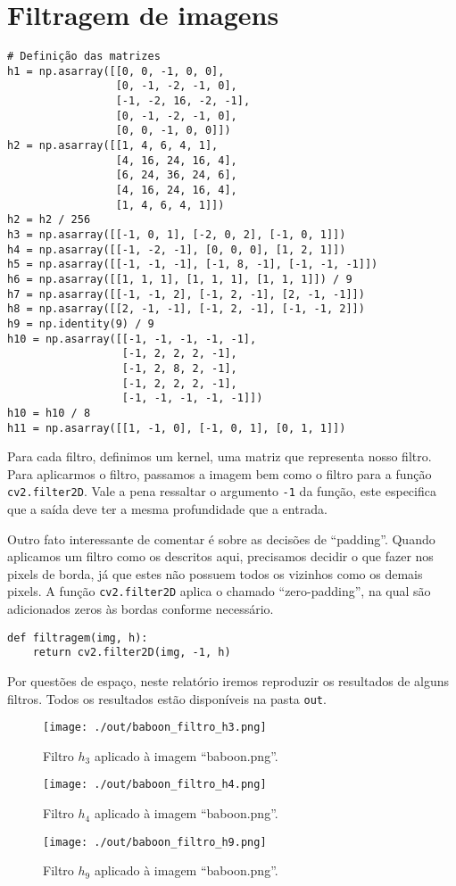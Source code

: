 \documentclass[11pt]{article}
\begin{document}
\newpage
\section*{Filtragem de imagens}
\label{sec:orgd34e85b}
\begin{verbatim}
# Definição das matrizes
h1 = np.asarray([[0, 0, -1, 0, 0],
                 [0, -1, -2, -1, 0],
                 [-1, -2, 16, -2, -1],
                 [0, -1, -2, -1, 0],
                 [0, 0, -1, 0, 0]])
h2 = np.asarray([[1, 4, 6, 4, 1],
                 [4, 16, 24, 16, 4],
                 [6, 24, 36, 24, 6],
                 [4, 16, 24, 16, 4],
                 [1, 4, 6, 4, 1]])
h2 = h2 / 256
h3 = np.asarray([[-1, 0, 1], [-2, 0, 2], [-1, 0, 1]])
h4 = np.asarray([[-1, -2, -1], [0, 0, 0], [1, 2, 1]])
h5 = np.asarray([[-1, -1, -1], [-1, 8, -1], [-1, -1, -1]])
h6 = np.asarray([[1, 1, 1], [1, 1, 1], [1, 1, 1]]) / 9
h7 = np.asarray([[-1, -1, 2], [-1, 2, -1], [2, -1, -1]])
h8 = np.asarray([[2, -1, -1], [-1, 2, -1], [-1, -1, 2]])
h9 = np.identity(9) / 9
h10 = np.asarray([[-1, -1, -1, -1, -1],
                  [-1, 2, 2, 2, -1],
                  [-1, 2, 8, 2, -1],
                  [-1, 2, 2, 2, -1],
                  [-1, -1, -1, -1, -1]])
h10 = h10 / 8
h11 = np.asarray([[1, -1, 0], [-1, 0, 1], [0, 1, 1]])
\end{verbatim}

Para cada filtro, definimos um kernel, uma matriz que representa nosso filtro.
Para aplicarmos o filtro, passamos a imagem bem como o filtro para a função \texttt{cv2.filter2D}.
Vale a pena ressaltar o argumento \texttt{-1} da função, este especifica que a saída deve ter a mesma profundidade que a entrada.

Outro fato interessante de comentar é sobre as decisões de ``padding''.
Quando aplicamos um filtro como os descritos aqui, precisamos decidir o que fazer nos pixels de borda, já que estes não possuem todos os vizinhos como os demais pixels.
A função \texttt{cv2.filter2D} aplica o chamado ``zero-padding'', na qual são adicionados zeros às bordas conforme necessário.
\begin{verbatim}
def filtragem(img, h):
    return cv2.filter2D(img, -1, h)
\end{verbatim}

Por questões de espaço, neste relatório iremos reproduzir os resultados de alguns filtros.
Todos os resultados estão disponíveis na pasta \texttt{out}.

\begin{figure}[H]
\centering
\texttt{[image: ./out/baboon\_filtro\_h3.png]}
\caption{Filtro \(h_3\) aplicado à imagem ``baboon.png''.}
\end{figure}
\begin{figure}[H]
\centering
\texttt{[image: ./out/baboon\_filtro\_h4.png]}
\caption{Filtro \(h_4\) aplicado à imagem ``baboon.png''.}
\end{figure}
\begin{figure}[H]
\centering
\texttt{[image: ./out/baboon\_filtro\_h9.png]}
\caption{Filtro \(h_9\) aplicado à imagem ``baboon.png''.}
\end{figure}
\end{document}

